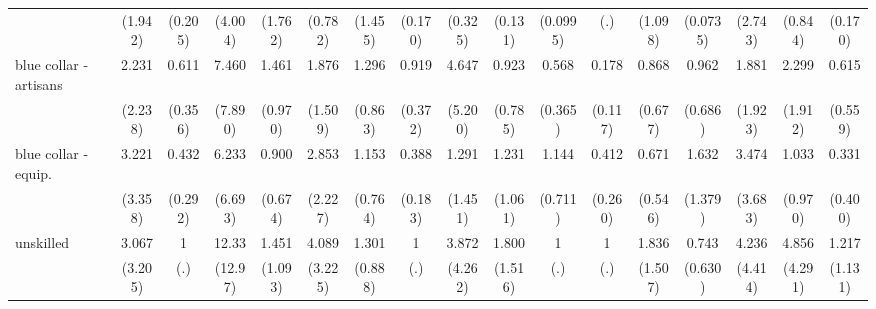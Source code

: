 {\begin{tabular}{l*{16}{c}}
                    &     (1.942)         &     (0.205)         &     (4.004)         &     (1.762)         &     (0.782)         &     (1.455)         &     (0.170)         &     (0.325)         &     (0.131)         &    (0.0995)         &         (.)         &     (1.098)         &    (0.0735)         &     (2.743)         &     (0.844)         &     (0.170)         \\
[1em]
blue collar - artisans&       2.231         &       0.611         &       7.460         &       1.461         &       1.876         &       1.296         &       0.919         &       4.647         &       0.923         &       0.568         &       0.178\sym{**} &       0.868         &       0.962         &       1.881         &       2.299         &       0.615         \\
                    &     (2.238)         &     (0.356)         &     (7.890)         &     (0.970)         &     (1.509)         &     (0.863)         &     (0.372)         &     (5.200)         &     (0.785)         &     (0.365)         &     (0.117)         &     (0.677)         &     (0.686)         &     (1.923)         &     (1.912)         &     (0.559)         \\
[1em]
blue collar - equip.&       3.221         &       0.432         &       6.233         &       0.900         &       2.853         &       1.153         &       0.388\sym{*}  &       1.291         &       1.231         &       1.144         &       0.412         &       0.671         &       1.632         &       3.474         &       1.033         &       0.331         \\
                    &     (3.358)         &     (0.292)         &     (6.693)         &     (0.674)         &     (2.227)         &     (0.764)         &     (0.183)         &     (1.451)         &     (1.061)         &     (0.711)         &     (0.260)         &     (0.546)         &     (1.379)         &     (3.683)         &     (0.970)         &     (0.400)         \\
[1em]
unskilled           &       3.067         &           1         &       12.33\sym{*}  &       1.451         &       4.089         &       1.301         &           1         &       3.872         &       1.800         &           1         &           1         &       1.836         &       0.743         &       4.236         &       4.856         &       1.217         \\
                    &     (3.205)         &         (.)         &     (12.97)         &     (1.093)         &     (3.225)         &     (0.888)         &         (.)         &     (4.262)         &     (1.516)         &         (.)         &         (.)         &     (1.507)         &     (0.630)         &     (4.414)         &     (4.291)         &     (1.131)         \\

\end{tabular}}
